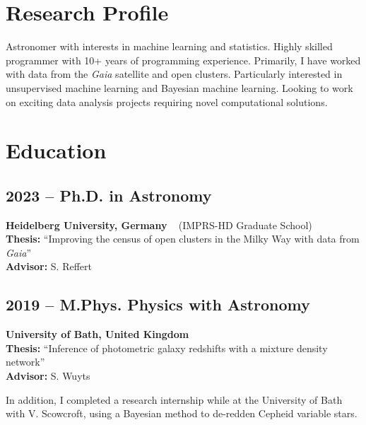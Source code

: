 \documentclass[12pt, letterpaper]{hunt-cv}
\begin{document}
\thispagestyle{plain}  %

\cvTitle

\section*{Research Profile}

Astronomer with interests in machine learning and statistics. Highly skilled programmer with 10+ years of programming experience. Primarily, I have worked with data from the \emph{Gaia} satellite and open clusters. Particularly interested in unsupervised machine learning and Bayesian machine learning. Looking to work on exciting data analysis projects requiring novel computational solutions.


\section*{Education}

\subsection*{2023 -- Ph.D. in Astronomy}
\begin{addmargin}[1em]{0em}
    \textbf{Heidelberg University, Germany} ~ (IMPRS-HD Graduate School)\\
    \textbf{Thesis:} ``Improving the census of open clusters in the Milky Way with data from \emph{Gaia}''\\
    \textbf{Advisor:} S. Reffert
\end{addmargin}

\subsection*{2019 -- M.Phys. Physics with Astronomy}
\begin{addmargin}[1em]{0em}
    \textbf{University of Bath, United Kingdom}\\
    \textbf{Thesis:} ``Inference of photometric galaxy redshifts with a
    mixture density network''\\
    \textbf{Advisor:} S. Wuyts
\end{addmargin}

\vspace{0.35cm}
In addition, I completed a research internship while at the University of Bath with V. Scowcroft, using a Bayesian method to de-redden Cepheid variable stars.
\end{document}
